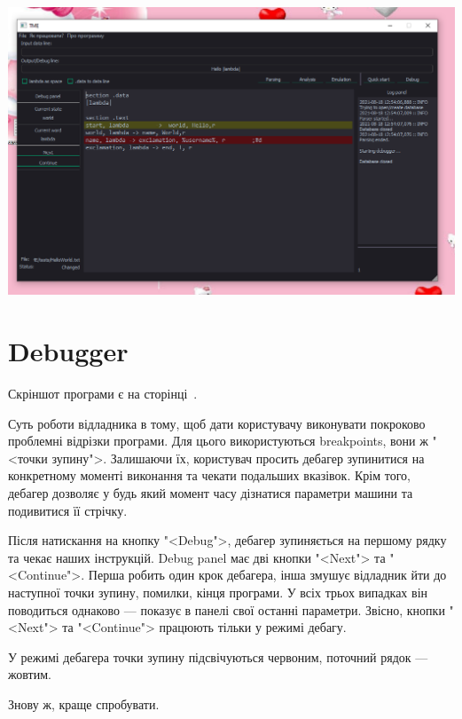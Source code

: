 \documentclass[oneside,final,14pt]{extreport}
\newenvironment{changemargin}[2]{%
\begin{list}{}{%
\setlength{\topsep}{0pt}%
\setlength{\leftmargin}{#1}%
\setlength{\rightmargin}{#2}%
\setlength{\listparindent}{\parindent}%
\setlength{\itemindent}{\parindent}%
\setlength{\parsep}{\parskip}%
}%
\item[]}{\end{list}}
\begin{document}
\begin{changemargin}{-10,3cm}{1,1cm}
\begin{landscape}
\includegraphics[scale=0.94]{1}
\label{screenshot}
\end{landscape}
\end{changemargin}

\newpage
\section{Debugger}
Скріншот програми є на сторінці \,\pageref{screenshot}.
\medskip

Суть роботи відладника в тому, щоб дати користувачу виконувати покроково проблемні відрізки програми. Для цього використуються breakpoints, вони ж "<точки зупину">. Залишаючи їх, користувач просить дебагер зупинитися на конкретному моменті виконання та чекати подальших вказівок. Крім того, дебагер дозволяє у будь який момент часу дізнатися параметри машини та подивитися її стрічку.

Після натискання на кнопку "<Debug">, дебагер зупиняється на першому рядку та чекає наших інструкцій. Debug panel має дві кнопки "<Next"> та "<Continue">. Перша робить один крок дебагера, інша змушує відладник йти до наступної точки зупину, помилки, кінця програми. У всіх трьох випадках він поводиться однаково --- показує в панелі свої останні параметри.
Звісно, кнопки "<Next"> та "<Continue"> працюють тільки у режимі дебагу.

У режимі дебагера точки зупину підсвічуються червоним, поточний рядок --- жовтим.

Знову ж, краще спробувати.
\end{document}
